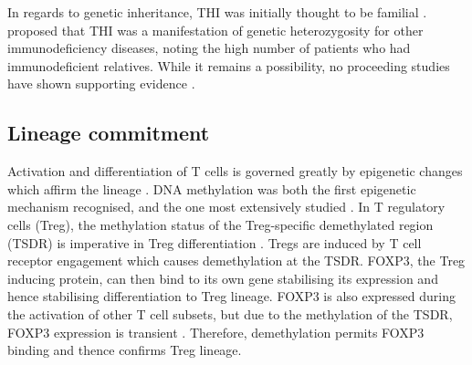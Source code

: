 \documentclass[12pt]{article}
\begin{document}
			In regards to genetic inheritance, THI was initially thought to be familial \citep{Willenbockel60}. 
			\citet{Soothill68} proposed that THI was a manifestation of genetic heterozygosity for other immunodeficiency diseases, noting the high number of patients who had immunodeficient relatives.
			While it remains a possibility, no proceeding studies have shown supporting evidence \citep{Tiller78,Fiorilli86, Ovadia14}.
			
			
		\subsection{Lineage commitment}
	
			Activation and differentiation of T cells is governed greatly by epigenetic changes which affirm the lineage \citep{Zeng13}.
			DNA methylation was both the first epigenetic mechanism recognised, and the one most extensively studied \citep{Begin14}. 
			In T regulatory cells (Treg), the methylation status of the Treg-specific demethylated region (TSDR) is imperative in Treg differentiation \citep{Polansky08}.
			Tregs are induced by T cell receptor engagement which causes demethylation at the TSDR.
			FOXP3, the Treg inducing protein, can then bind to its own gene stabilising its expression and hence stabilising differentiation to Treg lineage.
			FOXP3 is also expressed during the activation of other T cell subsets, but due to the methylation of the TSDR, FOXP3 expression is transient \citep{Ohkura13}.
			Therefore, demethylation permits FOXP3 binding and thence confirms Treg lineage.
	
\end{document}
